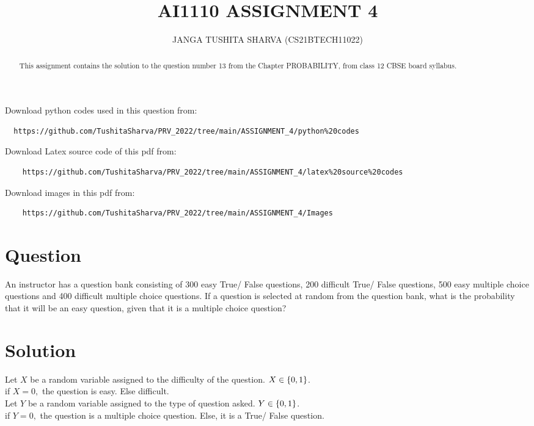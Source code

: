 \documentclass[journal,12pt,twocolumn]{IEEEtran}
\begin{document}
    
\title{
	AI1110 ASSIGNMENT 4
}
\author{ JANGA TUSHITA SHARVA (CS21BTECH11022)%
}	

\maketitle

Download python codes used in this question from:

\begin{lstlisting}
  https://github.com/TushitaSharva/PRV_2022/tree/main/ASSIGNMENT_4/python%20codes
\end{lstlisting}

Download Latex source code of this pdf from: 
\begin{lstlisting}
    https://github.com/TushitaSharva/PRV_2022/tree/main/ASSIGNMENT_4/latex%20source%20codes
\end{lstlisting}

Download images in this pdf from: 
\begin{lstlisting}
    https://github.com/TushitaSharva/PRV_2022/tree/main/ASSIGNMENT_4/Images
\end{lstlisting}

\begin{abstract}
This assignment contains the solution to the question number 13 from the Chapter PROBABILITY, from class 12 CBSE board syllabus.
\end{abstract}


\section{Question}

An instructor has a question bank consisting of 300 easy True/ False questions, 200 difficult True/ False questions, 500 easy multiple choice questions and 400 difficult multiple choice questions. If a question is selected at random from the question bank, what is the probability that it will be an easy question, given that it is a multiple choice question?

\section{Solution}
Let $X$ be a random variable assigned to the difficulty of the question.
$X \in \left\{0, 1\right\}$. \\
if $X = 0,$ the question is easy. Else difficult.\\
Let $Y$ be a random variable assigned to the type of question asked.
$Y \in \left\{0, 1\right\}$. \\
if $Y = 0,$ the question is a multiple choice question. Else, it is a True/ False question.
\end{document}
